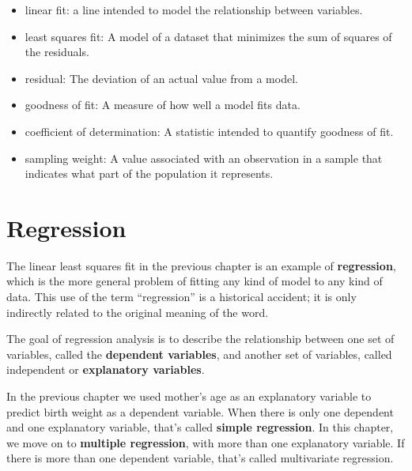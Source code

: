 \documentclass[12pt]{book}
\begin{document}
\begin{itemize}

\item linear fit: a line intended to model the relationship between
variables.  

\item least squares fit: A model of a dataset that minimizes the
sum of squares of the residuals.

\item residual: The deviation of an actual value from a model.

\item goodness of fit: A measure of how well a model fits data.

\item coefficient of determination: A statistic intended to
quantify goodness of fit.

\item sampling weight: A value associated with an observation in a
  sample that indicates what part of the population it represents.

\end{itemize}



\chapter{Regression}
\label{regression}

The linear least squares fit in the previous chapter is an example of
{\bf regression}, which is the more general problem of fitting any
kind of model to any kind of data.  This use of the term ``regression''
is a historical accident; it is only indirectly related to the
original meaning of the word.

The goal of regression analysis is to describe the relationship
between one set of variables, called the {\bf dependent variables},
and another set of variables, called independent or {\bf
  explanatory variables}.

In the previous chapter we used mother's age as an explanatory
variable to predict birth weight as a dependent variable.  When there
is only one dependent and one explanatory variable, that's called {\bf
  simple regression}.  In this chapter, we move on to {\bf multiple
  regression}, with more than one explanatory variable.  If there is
more than one dependent variable, that's called multivariate
regression.
\end{document}
